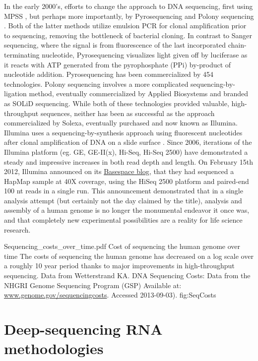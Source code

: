 In the early 2000’s, efforts to change the approach to DNA sequencing, first using MPSS \citep{Brenner2000a}, but perhaps more importantly, by Pyrosequencing \citep{Ronaghi1998a} and Polony sequencing \citep{Shendure2005}. Both of the latter methods utilize emulsion PCR \citep{Nakano2003a} for clonal amplification prior to sequencing, removing the bottleneck of bacterial cloning. In contrast to Sanger sequencing, where the signal is from fluorescence of the last incorporated chain-terminating nucleotide, Pyrosequencing visualizes light given off by luciferase as it reacts with ATP generated from the pyrophosphate (PPi) by-product of nucleotide addition. Pyrosequencing has been commercialized by 454 technologies. Polony sequencing involves a more complicated sequencing-by-ligation method, eventually commercialized by Applied Biosystems and branded as SOLiD sequencing. While both of these technologies provided valuable, high-throughput sequences, neither has been as successful as the approach commercialized by Solexa, eventually purchased and now known as Illumina.
Illumina uses a sequencing-by-synthesis approach using fluorescent nucleotides after clonal amplification of DNA on a slide surface \citep{Bentley2008}. Since 2006, iterations of the Illumina platform (eg. GE, GE-II(x), Hi-Seq, Hi-Seq 2500) have demonstrated a steady and impressive increases in both read depth and length. On February 15th 2012, Illumina announced on its \href{http://blog.basespace.illumina.com/}{Basespace blog}, that they had sequenced a HapMap sample at 40X coverage, using the HiSeq 2500 platform and paired-end 100 nt reads in a single run. This announcement demonstrated that in a single analysis attempt (but certainly not the day claimed by the title), analysis and assembly of a human genome is no longer the monumental endeavor it once was, and that completely new experimental possibilities are a reality for life science research.

\InsertFigure
	{Sequencing_costs_over_time.pdf}
	{Cost of sequencing the human genome over time}
	{
		The costs of sequencing the human genome has decreased on a log scale over a roughly 10 year period thanks 
		to major improvements in high-throughput sequencing. Data from Wetterstrand KA. DNA Sequencing Costs: 
		Data from the NHGRI Genome Sequencing Program (GSP) Available at: \url{www.genome.gov/sequencingcosts}.
		Accessed 2013-09-03).
	}
	{fig:SeqCosts}

\section{Deep-sequencing RNA methodologies}

